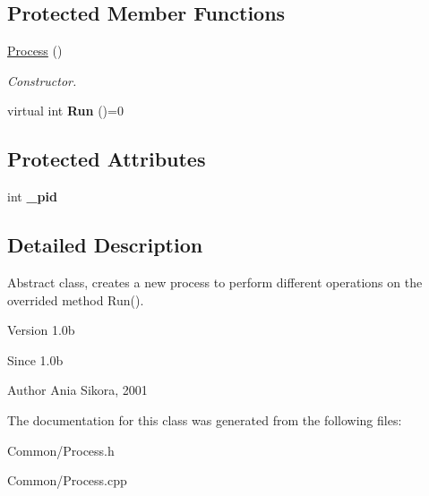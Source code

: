 \subsection*{Protected Member Functions}
\begin{DoxyCompactItemize}
\item 
\hypertarget{class_common_1_1_process_ab7bd6318e6828ba84639c94dca871959}{\hyperlink{class_common_1_1_process_ab7bd6318e6828ba84639c94dca871959}{Process} ()}\label{class_common_1_1_process_ab7bd6318e6828ba84639c94dca871959}

\begin{DoxyCompactList}\small\item\em Constructor. \end{DoxyCompactList}\item 
\hypertarget{class_common_1_1_process_a1d4cb970f44c0652afa6536ca5ccf4f1}{virtual int {\bfseries Run} ()=0}\label{class_common_1_1_process_a1d4cb970f44c0652afa6536ca5ccf4f1}

\end{DoxyCompactItemize}
\subsection*{Protected Attributes}
\begin{DoxyCompactItemize}
\item 
\hypertarget{class_common_1_1_process_a857c5dd43f0febae07fec9e849a5b881}{int {\bfseries \-\_\-pid}}\label{class_common_1_1_process_a857c5dd43f0febae07fec9e849a5b881}

\end{DoxyCompactItemize}


\subsection{Detailed Description}
Abstract class, creates a new process to perform different operations on the overrided method Run(). 

\begin{DoxyVersion}{Version}
1.\-0b 
\end{DoxyVersion}
\begin{DoxySince}{Since}
1.\-0b 
\end{DoxySince}
\begin{DoxyAuthor}{Author}
Ania Sikora, 2001 
\end{DoxyAuthor}


The documentation for this class was generated from the following files\-:\begin{DoxyCompactItemize}
\item 
Common/Process.\-h\item 
Common/Process.\-cpp\end{DoxyCompactItemize}
